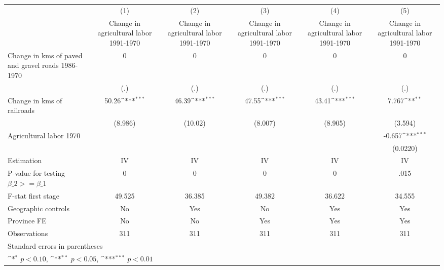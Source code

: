 {
\def\sym#1{\ifmmode^{#1}\else\(^{#1}\)\fi}
\begin{tabular}{l*{5}{c}}
\hline\hline
                    &\multicolumn{1}{c}{(1)}&\multicolumn{1}{c}{(2)}&\multicolumn{1}{c}{(3)}&\multicolumn{1}{c}{(4)}&\multicolumn{1}{c}{(5)}\\
                    &\multicolumn{1}{c}{Change in agricultural labor 1991-1970}&\multicolumn{1}{c}{Change in agricultural labor 1991-1970}&\multicolumn{1}{c}{Change in agricultural labor 1991-1970}&\multicolumn{1}{c}{Change in agricultural labor 1991-1970}&\multicolumn{1}{c}{Change in agricultural labor 1991-1970}\\
\hline
Change in kms of paved and gravel roads 1986-1970&           0         &           0         &           0         &           0         &           0         \\
                    &         (.)         &         (.)         &         (.)         &         (.)         &         (.)         \\
[1em]
Change in kms of railroads&       50.26\sym{***}&       46.39\sym{***}&       47.55\sym{***}&       43.41\sym{***}&       7.767\sym{**} \\
                    &     (8.986)         &     (10.02)         &     (8.007)         &     (8.905)         &     (3.594)         \\
[1em]
Agricultural labor 1970&                     &                     &                     &                     &      -0.657\sym{***}\\
                    &                     &                     &                     &                     &    (0.0220)         \\
\hline
Estimation          &          IV         &          IV         &          IV         &          IV         &          IV         \\
P-value for testing $\beta\_2 >= \beta\_1$&           0         &           0         &           0         &           0         &        .015         \\
F-stat first stage  &      49.525         &      36.385         &      49.382         &      36.622         &      34.555         \\
Geographic controls &          No         &         Yes         &          No         &         Yes         &         Yes         \\
Province FE         &          No         &          No         &         Yes         &         Yes         &         Yes         \\
Observations        &         311         &         311         &         311         &         311         &         311         \\
\hline\hline
\multicolumn{6}{l}{\footnotesize Standard errors in parentheses}\\
\multicolumn{6}{l}{\footnotesize \sym{*} \(p<0.10\), \sym{**} \(p<0.05\), \sym{***} \(p<0.01\)}\\
\end{tabular}
}
